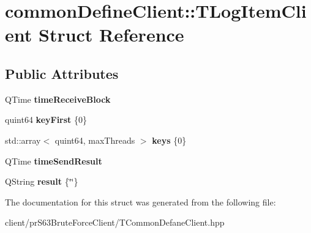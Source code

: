 \hypertarget{structcommon_define_client_1_1_t_log_item_client}{}\section{common\+Define\+Client\+:\+:T\+Log\+Item\+Client Struct Reference}
\label{structcommon_define_client_1_1_t_log_item_client}
\subsection*{Public Attributes}
\begin{DoxyCompactItemize}
\item 
\mbox{\label{structcommon_define_client_1_1_t_log_item_client_ab2a6064d43c8dbe637188b3c9b7835a9}} 
Q\+Time {\bfseries time\+Receive\+Block}
\item 
\mbox{\label{structcommon_define_client_1_1_t_log_item_client_aa8d3e11c4173fcd797ce8e8c53d93c8b}} 
quint64 {\bfseries key\+First} \{0\}
\item 
\mbox{\label{structcommon_define_client_1_1_t_log_item_client_abe6f35c52279fda23abce2af8ba3da9c}} 
std\+::array$<$ quint64, max\+Threads $>$ {\bfseries keys} \{0\}
\item 
\mbox{\label{structcommon_define_client_1_1_t_log_item_client_a39a08024bb4f93474f739c4e2636fbe8}} 
Q\+Time {\bfseries time\+Send\+Result}
\item 
\mbox{\label{structcommon_define_client_1_1_t_log_item_client_a237d46da9198f1a7ad87554186f17f20}} 
Q\+String {\bfseries result} \{\char`\"{}\char`\"{}\}
\end{DoxyCompactItemize}


The documentation for this struct was generated from the following file\+:\begin{DoxyCompactItemize}
\item 
client/pr\+S63\+Brute\+Force\+Client/T\+Common\+Defane\+Client.\+hpp\end{DoxyCompactItemize}
